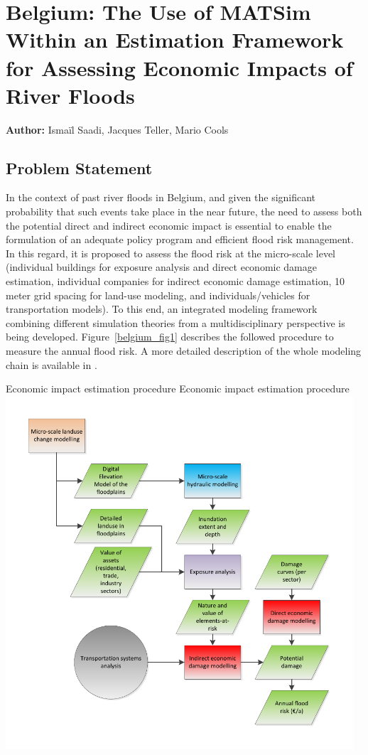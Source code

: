 \chapter{Belgium: The Use of MATSim Within an Estimation Framework for Assessing Economic Impacts of River Floods}
\label{ch:belgium}
\hfill \textbf{Author:} Ismaïl Saadi, Jacques Teller, Mario Cools

\section{Problem Statement}
In the context of past river floods in Belgium, and given the significant probability that such events take place in the near future, the need to assess both the potential direct and indirect economic impact is essential to enable the formulation of an adequate policy program and efficient flood risk management. 
In this regard, it is proposed to assess the flood risk  at the micro-scale level (\ie individual buildings for exposure analysis and direct economic damage estimation, individual companies for indirect economic damage estimation, 10\,meter grid spacing for land-use modeling, and individuals/vehicles for transportation models). 
To this end, an integrated modeling framework combining different simulation theories from a multidisciplinary perspective is being developed. 
Figure~\ref{belgium_fig1} describes the followed procedure to measure the annual flood risk. 
A more detailed description of the whole modeling chain is available in \citet[][]{DewalsEtAl_IAHR_2015}.

\createfigure%
{Economic impact estimation procedure}%
{Economic impact estimation procedure}%
{\label{fig:belgium_fig1}}%
{\includegraphics[width=0.97\textwidth, angle=0]{scenarios/figures/belgium_fig1.pdf}}%
{}

